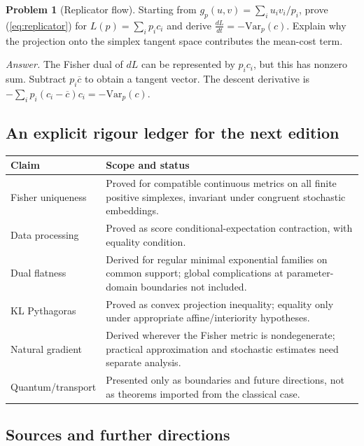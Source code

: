 \documentclass[11pt]{article}
\theoremstyle{definition}\newtheorem{definition}[theorem]{Definition}\newtheorem{exercise}{Problem}[section]
\begin{document}
\begin{exercise}[Replicator flow]
Starting from $g_p(u,v)=\sum_i u_iv_i/p_i$, prove (\ref{eq:replicator}) for $L(p)=\sum_i p_ic_i$ and derive $\frac{dL}{dt}=-\mathrm{Var}_p(c)$. Explain why the projection onto the simplex tangent space contributes the mean-cost term.
\end{exercise}
\emph{Answer.} The Fisher dual of $dL$ can be represented by $p_ic_i$, but this has nonzero sum. Subtract $p_i\overline c$ to obtain a tangent vector. The descent derivative is $-\sum_i p_i(c_i-\overline c)c_i=-\mathrm{Var}_p(c)$.

\subsection{An explicit rigour ledger for the next edition}

\begin{tabular}{p{.25\linewidth}p{.64\linewidth}}
\toprule
\textbf{Claim} & \textbf{Scope and status}\\\midrule
Fisher uniqueness & Proved for compatible continuous metrics on all finite positive simplexes, invariant under congruent stochastic embeddings.\\
Data processing & Proved as score conditional-expectation contraction, with equality condition.\\
Dual flatness & Derived for regular minimal exponential families on common support; global complications at parameter-domain boundaries not included.\\
KL Pythagoras & Proved as convex projection inequality; equality only under appropriate affine/interiority hypotheses.\\
Natural gradient & Derived wherever the Fisher metric is nondegenerate; practical approximation and stochastic estimates need separate analysis.\\
Quantum/transport & Presented only as boundaries and future directions, not as theorems imported from the classical case.\\
\bottomrule
\end{tabular}

\subsection{Sources and further directions}
\end{document}

